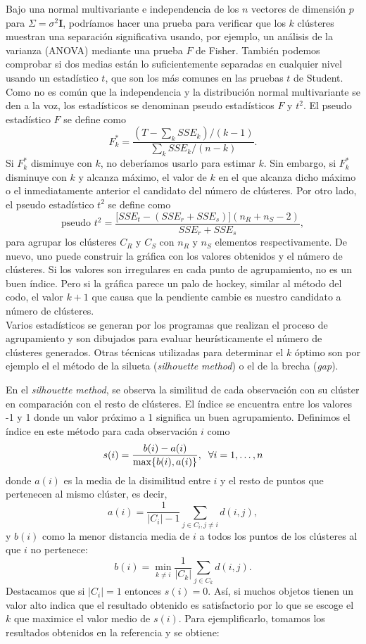 \documentclass[a4paper, 20pt]{article}
\begin{document}
Bajo una normal multivariante e independencia de los $ n $ vectores de dimensión $ p $ para $ \Sigma = \sigma^2 \textbf{I} $, podríamos hacer una prueba para verificar que los $ k $ clústeres muestran una separación significativa usando, por ejemplo, un análisis de la varianza (ANOVA) mediante una prueba $ F $ de Fisher. También podemos comprobar si dos medias están lo suficientemente separadas en cualquier nivel usando un estadístico $ t $, que son los más comunes en las pruebas $ t $ de Student. Como no es común que la independencia y la distribución normal multivariante se den a la voz, los estadísticos se denominan pseudo estadísticos $ F $ y  $ t^2 $. El pseudo estadístico $ F $ se define como
\[
F^*_k = \frac{(T-\sum_k SSE_k) / (k-1)}{\sum_k SSE_k / (n-k)}.
\]
Si $ F^*_k $ disminuye con $ k $, no deberíamos usarlo para estimar $ k $. Sin embargo, si $ F^*_k $ disminuye con $ k $ y alcanza máximo, el valor de $ k $ en el que alcanza dicho máximo o el inmediatamente anterior el candidato del número de clústeres. Por otro lado, el pseudo estadístico $ t^2 $ se define como
\[
\text{pseudo }t^2 = \frac{\lbrack SSE_t - (SSE_r + SSE_s)\rbrack(n_R + n_S - 2)}{SSE_r + SSE_s},
\]
para agrupar los clústeres $ C_R $ y $ C_S $ con $ n_R $ y $ n_S $ elementos respectivamente. De nuevo, uno puede construir la gráfica con los valores obtenidos y el número de clústeres. Si los valores son irregulares en cada punto de agrupamiento, no es un buen índice. Pero si la gráfica parece un palo de hockey, similar al método del codo, el valor $ k +1 $ que causa que la pendiente cambie es nuestro candidato a número de clústeres. \\

Varios estadísticos se generan por los programas que realizan el proceso de agrupamiento y son dibujados para evaluar heurísticamente el número de clústeres generados. Otras técnicas utilizadas para determinar el $ k $ óptimo son por ejemplo el el método de la silueta (\textit{silhouette method}) o el de la brecha (\textit{gap}).

En el \textit{silhouette method}, se observa la similitud de cada observación con su clúster en comparación con el resto de clústeres. El índice se encuentra entre los valores -1 y 1 donde un valor próximo a 1 significa un buen agrupamiento. Definimos el índice en este método para cada observación $ i $ como
\[
s(i) = \frac{b(i)-a(i)}{\max\{b(i), a(i)\}}, \hspace{2mm} \forall i = 1, \dots, n
\] 
donde $ a(i) $ es la media de la disimilitud entre $ i $ y el resto de puntos que pertenecen al mismo clúster, es decir,
\[
a(i) = \frac{1}{|C_i|-1}\sum_{j\in C_i, j \neq i} d(i,j),
\]
y $ b(i) $ como la menor distancia media de $ i $ a todos los puntos de los clústeres al que $ i $ no pertenece:
\[
b(i) = \min_{k \neq i} \frac{1}{|C_k|} \sum_{j \in C_k} d(i,j).
\] 
Destacamos que si $ |C_i| = 1 $ entonces $ s(i) = 0 $. Así, si muchos objetos tienen un valor alto indica que el resultado obtenido es satisfactorio por lo que se escoge el $ k $ que maximice el valor medio de $ s(i) $. Para ejemplificarlo, tomamos los resultados obtenidos en la referencia \cite{silouetteGraph} y se obtiene:
\end{document}
